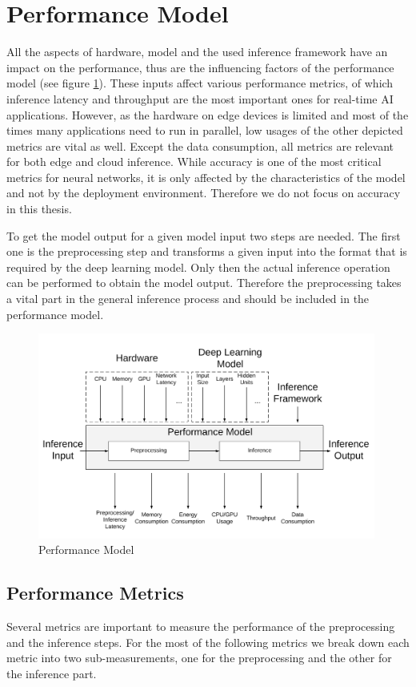 \section{Performance Model}
All the aspects of hardware, model and the used inference framework have an impact on the performance, thus are the influencing factors of the performance model (see figure \ref{fig:perfmodel}). These inputs affect various performance metrics, of which inference latency and throughput are the most important ones for real-time AI applications. However, as the hardware on edge devices is limited and most of the times many applications need to run in parallel, low usages of the other depicted metrics are vital as well.
Except the data consumption, all metrics are relevant for both edge and cloud inference.
While accuracy is one of the most critical metrics for neural networks, it is only affected by the characteristics of the model and not by the deployment environment. Therefore we do not focus on accuracy in this thesis.

To get the model output for a given model input two steps are needed. The first one is the preprocessing step and transforms a given input into the format that is required by the deep learning model. Only then the actual inference operation can be performed to obtain the model output. Therefore the preprocessing takes a vital part in the general inference process and should be included in the performance model.
\begin{figure}[H]
\centering
\includegraphics[width=0.99\textwidth]{./Bilder/trade_offs.png}
\caption{Performance Model}
\label{fig:perfmodel}
\end{figure}
\subsection{Performance Metrics}
Several metrics are important to measure the performance of the preprocessing and the inference steps. For the most of the following metrics we break down each metric into two sub-measurements, one for the preprocessing  and the other for the inference part.

